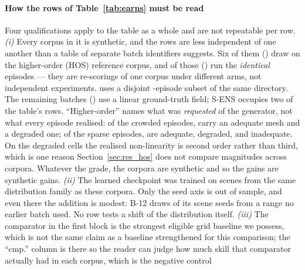 \documentclass[review]{elsarticle}
\begin{document}
\paragraph{How the rows of Table~\ref{tab:earns} must be read}
Four qualifications apply to the table as a whole and are not repeatable per row.
\emph{(i)} Every corpus in it is synthetic, and the rows are less independent of one
another than a table of separate batch identifiers suggests. Six of them
(\HosRows{}) draw on the higher-order (HOS) reference corpus, and \HosSameN{} of
those (\HosSameRows{}) run the \emph{identical} \AblationEps{} episodes --- they are
re-scorings of one corpus under different arms, not independent experiments.
\HosDisjointRows{} uses a disjoint \BNineteenN{}-episode subset of the same
directory. The remaining \LinearN{} batches (\LinearRows{}) use a linear ground-truth
field; S-ENS occupies two of the table's rows.
``Higher-order'' names what was \emph{requested} of the
generator, not what every episode realised: of the \HosCrowdedN{} crowded episodes,
\HosCrowdedAdequate{} carry an adequate mesh and \HosCrowdedDegraded{} a degraded
one; of the \HosSparseN{} sparse episodes, \HosSparseAdequate{} are adequate,
\HosSparseDegraded{} degraded, and \HosSparseInadequate{} inadequate. On the degraded cells
the realised non-linearity is second order rather than third, which is one reason
Section~\ref{sec:res_hos} does not compare magnitudes across corpora. Whatever the
grade, the corpora are synthetic and so the gains are synthetic gains. \emph{(ii)} The learned checkpoint was trained on scenes from the
same distribution family as these corpora. Only the seed axis is out of sample, and even
there the addition is modest: B-12 draws \BTwelveFreshSeeds{} of its
\BTwelveSeeds{} scene seeds from a range no earlier batch used. No row tests a shift
of the distribution itself.
\emph{(iii)} The comparator in the first block is the strongest eligible grid
baseline we possess, which is not the same claim as a baseline strengthened for
this comparison; the ``cmp.'' column is there so the reader can judge how much
skill that comparator actually had in each corpus, which is the negative control
\end{document}
